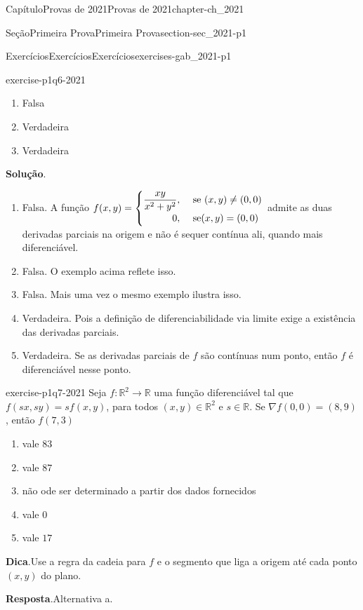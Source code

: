 \documentclass[oneside,10pt,]{book}
\newcommand{\blocktitlefont}{\relax}
\numberwithin{equation}{section}
\newcommand{\R}{\mathbb R}
\begin{document}
\begin{chapterptx}{Capítulo}{Provas de 2021}{}{Provas de 2021}{}{}{chapter-ch_2021}
\begin{sectionptx}{Seção}{Primeira Prova}{}{Primeira Prova}{}{}{section-sec_2021-p1}
\begin{exercises-subsection-numberless}{Exercícios}{Exercícios}{}{Exercícios}{}{}{exercises-gab_2021-p1}
\begin{divisionexercise}{6}{}{}{exercise-p1q6-2021}
\begin{enumerate}[label=\alph*]
\item{}Falsa%
\item{}Verdadeira%
\item{}Verdadeira%
\end{enumerate}
%
\par\smallskip%
\noindent\textbf{\blocktitlefont Solução}.\hypertarget{solution-p1q6-2021-c}{}\quad{}%
\begin{enumerate}[label=\alph*]
\item{}Falsa. A função \(f(x,y)=\begin{cases}
\dfrac{xy}{x^2+y^2},&\text{ se }(x,y)\neq (0,0)\\
\hfill 0,&\text{ se} (x,y)=(0,0)
\end{cases}\) admite as duas derivadas parciais na origem e não é sequer contínua ali, quando mais diferenciável.%
\item{}Falsa. O exemplo acima reflete isso.%
\item{}Falsa. Mais uma vez o mesmo exemplo ilustra isso.%
\item{}Verdadeira. Pois a definição de diferenciabilidade via limite exige a existência das derivadas parciais.%
\item{}Verdadeira. Se as derivadas parciais de \(f\) são contínuas num ponto, então \(f\) é diferenciável nesse ponto.%
\end{enumerate}
%
\end{divisionexercise}%
\begin{divisionexercise}{7}{}{}{exercise-p1q7-2021}%
Seja \(f\colon\R^2\to\R\) uma função diferenciável tal que \(f(sx,sy)=sf(x,y)\), para todos \((x,y)\in\R^2\) e \(s\in\R\). Se \(\nabla f(0,0)=(8,9)\), então \(f(7,3)\)%
\begin{enumerate}[label=\alph*]
\item{}vale \(83\)%
\item{}vale \(87\)%
\item{}não ode ser determinado a partir dos dados fornecidos%
\item{}vale \(0\)%
\item{}vale \(17\)%
\end{enumerate}
%
\par\smallskip%
\noindent\textbf{\blocktitlefont Dica}.\hypertarget{hint-p1q7-2021-b}{}\quad{}Use a regra da cadeia para \(f\) e o segmento que liga a origem até cada ponto \((x,y)\) do plano.%
\par\smallskip%
\noindent\textbf{\blocktitlefont Resposta}.\hypertarget{answer-p1q7-2021-c}{}\quad{}Alternativa a.%
\par\smallskip%

\end{divisionexercise}
\end{exercises-subsection-numberless}
\end{sectionptx}
\end{chapterptx}
\end{document}
